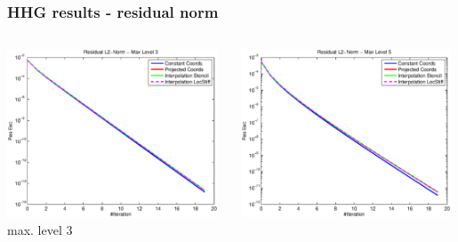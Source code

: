 \documentclass[t,compress=false,usepdftitle=false]{beamer}
\begin{document}
%
%
%
\begin{frame}\frametitle{HHG results - residual norm}

\begin{columns}[T] 
\begin{column}[T]{4.3cm} 
  \centering
  \includegraphics[width=0.98\textwidth]{spherepoisson_resEuc_level3}\\
  max. level 3
\end{column}\hfill
\begin{column}[T]{4.3cm} 
  \centering
  \includegraphics[width=0.98\textwidth]{spherepoisson_resEuc_level5}\\

\end{column}
\end{columns}
\end{frame}
\end{document}
